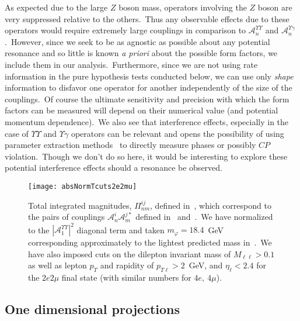 \documentclass[nofootinbib,twocolumn,prl,preprintnumbers]{revtex4-1}
\begin{document}
As expected due to the large $Z$ boson mass, operators involving the $Z$ boson are very suppressed relative to the others.~Thus any observable effects due to these operators would require extremely large couplings in comparison to $\mathcal{A}_n^{\Upsilon\Upsilon}$ and $\mathcal{A}_n^{\Upsilon\gamma}$.~However, since we seek to be as agnostic as possible about any potential resonance and so little is known \emph{a priori} about the possible form factors, we include them in our analysis.~Furthermore, since we are not using rate information in the pure hypothesis tests conducted below, we can use only \emph{shape} information to disfavor one operator for another independently of the size of the couplings.~Of course the ultimate sensitivity and precision with which the form factors can be measured will depend on their numerical value (and potential momentum dependence).~We also see that interference effects, especially in the case of $\Upsilon\Upsilon$ and $\Upsilon\gamma$ operators can be relevant and opens the possibility of using parameter extraction methods~\cite{Chen:2012jy,Chen:2013ejz,Khachatryan:2014kca} to directly measure phases or possibly $CP$ violation.~Though we don't do so here, it would be interesting to explore these potential interference effects should a resonance be observed.
\begin{figure}[t]
\texttt{[image: absNormTcuts2e2mu]}
\caption{Total integrated magnitudes, $\Pi^{ij}_{nm}$, defined in~, which correspond to the pairs of couplings $\mathcal{A}^i_n \mathcal{A}^{j\ast}_m$ defined in~ and~.~We have normalized to the $|\mathcal{A}^{\Upsilon\Upsilon}_1|^2$ diagonal term and taken $m_{\varphi} = 18.4$~GeV corresponding approximately to the lightest predicted mass in~\cite{Chen:2016jxd}.~We have also imposed cuts on the dilepton invariant mass of $M_{\ell\ell} > 0.1$ as well as lepton $p_T$ and rapidity of $p_{T\ell} > 2$~GeV, and $\eta_{\ell} < 2.4$ for the $2e2\mu$ final state (with similar numbers for $4e,~4\mu$).}
\label{fig:absnorm1}
\end{figure}



\subsection{One dimensional projections} \label{sec:proj}
\end{document}
